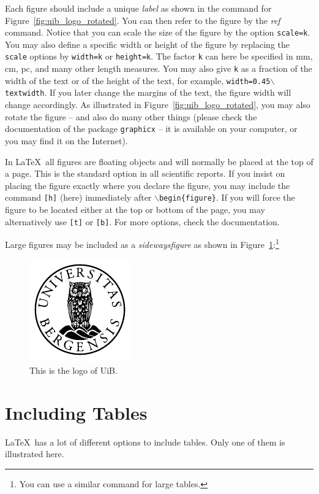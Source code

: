 \documentclass[../Main/thesis.tex]{subfiles}
\begin{document}
Each figure should include a unique \emph{label} as shown in the command for Figure~\ref{fig:uib_logo_rotated}. 
You can then refer to the figure by the \emph{ref} command.
Notice that you can scale the size of the figure by the option \texttt{scale=k}. 
You may also define a specific width or height of the figure by replacing the \texttt{scale} options by \texttt{width=k} or \texttt{height=k}. 
The factor \texttt{k} can here be specified in mm, cm, pc, and many other length measures. 
You may also give \texttt{k} as a fraction of the width of the text or of the height of the text, for example, \texttt{width=0.45$\backslash$textwidth}. 
If you later change the margins of the text, the figure width will change accordingly. 
As illustrated in Figure~\ref{fig:uib_logo_rotated}, you may also rotate the figure -- and also do many other things (please check the documentation of the package \texttt{graphicx} -- it is available on your computer, or you may find it on the Internet).

In \LaTeX\ all figures are floating objects and will normally be placed at the top of a page. 
This is the standard option in all scientific reports. 
If you insist on placing the figure exactly where you declare the figure, you may include the command \texttt{[h]} (here) immediately after $\backslash$\texttt{begin\{figure\}}. 
If you will force the figure to be located either at the top or bottom of the page, you may alternatively use  \texttt{[t]} or \texttt{[b]}. 
For more options, check the documentation.

Large figures may be included as a \emph{sidewaysfigure} as shown in Figure~\ref{fig:uib_logo}:\footnote{You can use a similar command for large tables.}
\begin{figure}
\centering
\includegraphics[scale=1.8]{../fig/uib}
\caption{This is the logo of UiB.}
\label{fig:uib_logo}
\end{figure}

\section{Including Tables}
\label{sec:including_tables}
\LaTeX\ has a lot of different options to include tables. 
Only one of them is illustrated here.
\end{document}
